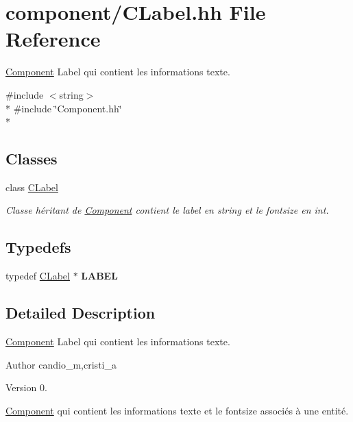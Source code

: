 \hypertarget{_c_label_8hh}{}\section{component/\+C\+Label.hh File Reference}
\label{_c_label_8hh}


\hyperlink{class_component}{Component} Label qui contient les informations texte.  


{\ttfamily \#include $<$string$>$}\\*
{\ttfamily \#include \char`\"{}Component.\+hh\char`\"{}}\\*
\subsection*{Classes}
\begin{DoxyCompactItemize}
\item 
class \hyperlink{class_c_label}{C\+Label}
\begin{DoxyCompactList}\small\item\em Classe héritant de \hyperlink{class_component}{Component} contient le label en string et le fontsize en int. \end{DoxyCompactList}\end{DoxyCompactItemize}
\subsection*{Typedefs}
\begin{DoxyCompactItemize}
\item 
\hypertarget{_c_label_8hh_ad5064fdc00d16f1b4425194006a3fc79}{}typedef \hyperlink{class_c_label}{C\+Label} $\ast$ {\bfseries L\+A\+B\+E\+L}\label{_c_label_8hh_ad5064fdc00d16f1b4425194006a3fc79}

\end{DoxyCompactItemize}


\subsection{Detailed Description}
\hyperlink{class_component}{Component} Label qui contient les informations texte. 

\begin{DoxyAuthor}{Author}
candio\+\_\+m,cristi\+\_\+a 
\end{DoxyAuthor}
\begin{DoxyVersion}{Version}
0.
\end{DoxyVersion}
\hyperlink{class_component}{Component} qui contient les informations texte et le fontsize associés à une entité. 